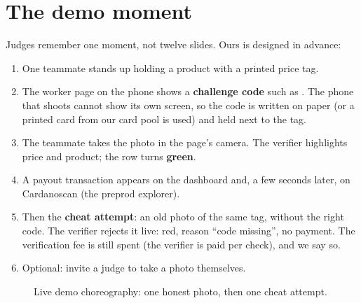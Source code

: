 \section{The demo moment}
Judges remember one moment, not twelve slides. Ours is designed in advance:

\begin{enumerate}
  \item One teammate stands up holding a product with a printed price tag.
  \item The worker page on the phone shows a \textbf{challenge code} such as . The phone that shoots cannot show its own screen, so the code is written on paper (or a printed card from our card pool is used) and held next to the tag.
  \item The teammate takes the photo in the page's camera. The verifier highlights price and product; the row turns \textbf{green}.
  \item A payout transaction appears on the dashboard and, a few seconds later, on Cardanoscan (the preprod explorer).
  \item Then the \textbf{cheat attempt}: an old photo of the same tag, without the right code. The verifier rejects it live: red, reason ``code missing'', no payment. The verification fee is still spent (the verifier is paid per check), and we say so.
  \item Optional: invite a judge to take a photo themselves.
\end{enumerate}

\begin{figure}[htbp]
\centering
{}
\caption{Live demo choreography: one honest photo, then one cheat attempt.}
\end{figure}

